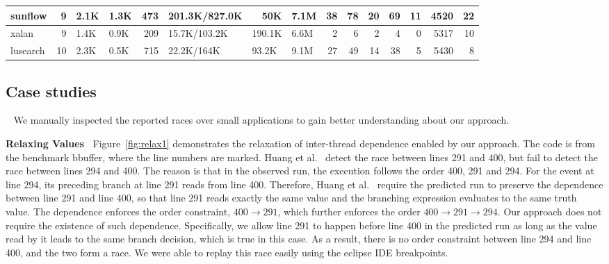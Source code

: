 \begin{table}[htbp]
\begin{flushleft}
\begin{tabular}{|l|r|r|r|r|l|r|r|r|r|r|r|r|r|r|}
sunflow & 9 & \multicolumn{1}{l|}{2.1K} & \multicolumn{1}{l|}{1.3K} & 473 & 201.3K/827.0K & 50K & \multicolumn{1}{l|}{7.1M} & 38 & 78 & 20 & 69 & 11 & 4520 & 22 \\ \hline
xalan & 9 & \multicolumn{1}{l|}{1.4K} & \multicolumn{1}{l|}{0.9K} & 209 & 15.7K/103.2K & \multicolumn{1}{l|}{190.1K} & \multicolumn{1}{l|}{6.6M} & 2 & 6 & 2 & 4 & 0 & 5317 & 10 \\ \hline
lusearch & 10 & \multicolumn{1}{l|}{2.3K} & \multicolumn{1}{l|}{0.5K} & 715 & 22.2K/164K & \multicolumn{1}{l|}{93.2K} & \multicolumn{1}{l|}{9.1M} & 27 & 49 & 14 & 38 & 5 & 5430 & 8 \\ \hline
\end{tabular}
\end{flushleft}
\label{tab:main}
\end{table}









  



\subsection{Case studies}~\label{sec:cases}
We manually inspected the reported races over small applications to gain better understanding about our approach. 

{\bf Relaxing Values\ } Figure~\ref{fig:relax1} demonstrates the relaxation of inter-thread dependence enabled by our approach. 
The code is from the benchmark {\sf bbuffer}, where the line numbers are
marked. Huang et al.~\cite{pldi14} detect the race between lines 291 and 400, 
but fail to detect the race between lines 294 and 400. The reason is 
that in the observed run, the execution follows the order 400, 291 and 294. 
For the event at line 294, its preceding branch at line 291 reads 
from line 400. Therefore, Huang et al.~\cite{pldi14}
require the predicted run to preserve the dependence between line 291 and 
line 400, so that line 291 reads exactly the same value and the branching 
expression evaluates to the same truth value. The dependence enforces 
the order constraint, $400 \rightarrow 291$, which further enforces 
the order $400\rightarrow 291 \rightarrow 294$.    Our approach does not 
require the existence of such dependence. Specifically, we allow line 
291 to happen before line 400 in the predicted run as long as the value 
read by it leads to the same branch decision, which is true in this case.  
As a result, there is no order constraint between line 294 and 
line 400, and the two form a race. We were able to replay this race  
easily using the eclipse IDE breakpoints. 


